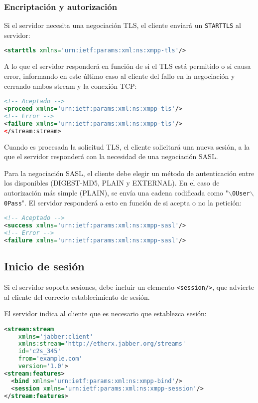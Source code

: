 \documentclass[a4paper, 11pt]{article} %
\begin{document}
  \subsubsection{Encriptación y autorización}
    Si el servidor necesita una negociación TLS, el cliente enviará un \texttt{STARTTLS} al servidor:
    \begin{lstlisting}[language=XML]
<starttls xmlns='urn:ietf:params:xml:ns:xmpp-tls'/>    
    \end{lstlisting}
    A lo que el servidor responderá en función de si el TLS está permitido o si causa error, informando en
    este último caso al cliente del fallo en la negociación y cerrando ambos stream y la conexión TCP:
    \begin{lstlisting}[language=XML]
<!-- Aceptado -->
<proceed xmlns='urn:ietf:params:xml:ns:xmpp-tls'/> 
<!-- Error -->
<failure xmlns='urn:ietf:params:xml:ns:xmpp-tls'/> 
</stream:stream>
    \end{lstlisting}
    Cuando es procesada la solicitud TLS, el cliente solicitará una nueva sesión, a la que el servidor
    responderá con la necesidad de una negociación SASL.

    Para la negociación SASL, el cliente debe elegir un método de autenticación entre los disponibles
    (DIGEST-MD5, PLAIN y EXTERNAL). En el caso de autorización más simple (PLAIN), se envía una cadena
    codificada como "\texttt{$\backslash$0User$\backslash$0Pass}". El servidor responderá a esto en 
    función de si acepta o no la petición:
    \begin{lstlisting}[language=XML]
<!-- Aceptado -->
<success xmlns='urn:ietf:params:xml:ns:xmpp-sasl'/>
<!-- Error -->
<failure xmlns='urn:ietf:params:xml:ns:xmpp-sasl'/>
    \end{lstlisting}
    
  \subsection{Inicio de sesión}
    Si el servidor soporta sesiones, debe incluir un elemento \texttt{<session/>}, que advierte al cliente del 
    correcto establecimiento de sesión.
    
    El servidor indica al cliente que es necesario que establezca sesión:
\begin{lstlisting}[language=XML]
<stream:stream
    xmlns='jabber:client'
    xmlns:stream='http://etherx.jabber.org/streams'
    id='c2s_345'
    from='example.com'
    version='1.0'>
<stream:features>
  <bind xmlns='urn:ietf:params:xml:ns:xmpp-bind'/>
  <session xmlns='urn:ietf:params:xml:ns:xmpp-session'/>
</stream:features>
\end{lstlisting}
\end{document}
